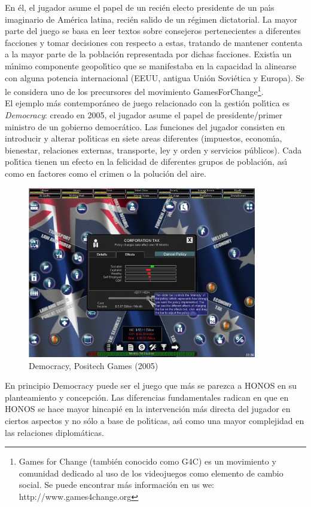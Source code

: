 En \'el, el jugador asume el papel de un reci\'en electo presidente de un pa\'{\i}s imaginario de Am\'erica latina, reci\'en salido de un r\'egimen dictatorial. La mayor parte del juego se basa en leer textos sobre consejeros pertenecientes a diferentes facciones y tomar decisiones con respecto a estas, tratando de mantener contenta a la mayor parte de la poblaci\'on representada por dichas facciones. Exist\'{\i}a un m\'{\i}nimo componente geopol\'{\i}tico que se manifestaba en la capacidad la alinearse con alguna potencia internacional (EEUU, antigua Uni\'on Sovi\'etica y Europa). Se le considera uno de los precursores del movimiento GamesForChange\footnote{Games for Change (tambi\'en conocido como G4C) es un movimiento y comunidad dedicado al uso de los videojuegos como elemento de cambio social. Se puede encontrar m\'as informaci\'on en us we: http://www.games4change.org }.\\

El ejemplo m\'as contempor\'aneo de juego relacionado con la gesti\'on pol\'{\i}tica es \emph{Democracy}: creado en 2005, el jugador asume el papel de presidente/primer ministro de un gobierno democr\'atico. Las funciones del jugador consisten en introducir y alterar pol\'{\i}ticas en siete areas diferentes (impuestos, econom\'{\i}a, bienestar, relaciones externas, transporte, ley y orden y servicios p\'ublicos). Cada pol\'{\i}tica tienen un efecto en la felicidad de diferentes grupos de poblaci\'on, as\'{\i} como en factores como el crimen o la poluci\'on del aire. 

\begin{figure}[h]
	\centering
		\includegraphics[width=10cm]{images/democracy.png}
	\caption{Democracy, Positech Games (2005)}
	\label{fig:Pantalla de juego de Democracy}
\end{figure}

En principio Democracy puede ser el juego que m\'as  se parezca a HONOS en su planteamiento y concepci\'on. Las diferencias fundamentales radican en que en HONOS se hace mayor hincapi\'e en la intervenci\'on m\'as directa del jugador en ciertos aspectos y no s\'olo a base de pol\'{\i}ticas, as\'{\i} como una mayor complejidad en las relaciones diplom\'aticas.